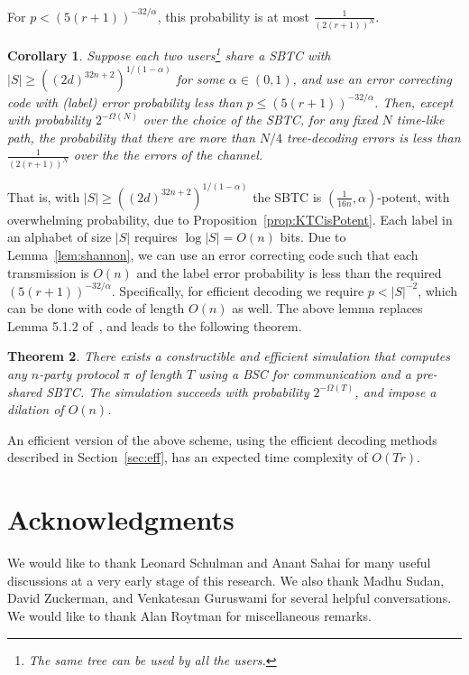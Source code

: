\documentclass[ letterpaper, 11pt]{article}
\newtheorem{theorem}{Theorem}[section]
\newtheorem{corollary}[theorem]{Corollary}
\newcommand{\potent}{potent\xspace}
\newcommand{\KTC}{\textsf{SBTC}\xspace}
\begin{document}
\noindent For  $p<(5(r+1))^{-32/\alpha}$,
this probability is at most $\frac{1}{(2(r+1))^N}$.
\begin{corollary}
Suppose each two users\footnote{The same tree can be used by all the users.} share a \KTC
with $|S|\ge ((2d)^{32n+2})^{1/(1-\alpha)}$ for some $\alpha\in(0,1)$,
and use an error correcting code with
(label) error probability less than $p\le(5(r+1))^{-32/\alpha}$.
Then, except with probability $2^{-\Omega(N)}$ over the choice of the \KTC,
for any fixed $N$ time-like path,
the probability that there are more than $N/4$ tree-decoding errors
is less than $\frac{1}{(2(r+1))^N}$
over the the errors of the channel.
\end{corollary}
That is, with $|S|\ge ((2d)^{32n+2})^{1/(1-\alpha)}$ the \KTC is $(\frac1{16n},\alpha)$-\potent, with
overwhelming probability, due to Proposition~\ref{prop:KTCisPotent}.
Each label in an alphabet of size $|S|$ requires $\log |S|=O(n)$ bits.
Due to Lemma~\ref{lem:shannon}, we can use an error correcting code
such that each transmission is $O(n)$ and the label error probability is
less than the required $(5(r+1))^{-32/\alpha}$. Specifically,
for efficient decoding we require $p  < |S|^{-2}$,
which can be done with code of length
$O(n)$ as well.
The above lemma replaces
Lemma 5.1.2 of~\cite{RS94}, and
leads to  the following theorem.
\begin{theorem}\label{thm:multiparty}
There exists a constructible and efficient  simulation
that computes any $n$-party protocol $\pi$ of length $T$
using a BSC for communication and a pre-shared \KTC.
The simulation succeeds with probability $2^{-\Omega(T)}$,
and impose a dilation of $O(n)$.
\end{theorem}
\noindent An efficient version of the above scheme,
using the efficient decoding methods described in Section~\ref{sec:eff},
has an expected time complexity of $O(Tr)$.


\section*{Acknowledgments}
We would like to thank Leonard Schulman and Anant Sahai for many useful discussions at a very early stage of this research. We also thank Madhu Sudan, David Zuckerman, and Venkatesan Guruswami for several helpful conversations.  We would like to thank Alan Roytman for miscellaneous remarks.
\end{document}
